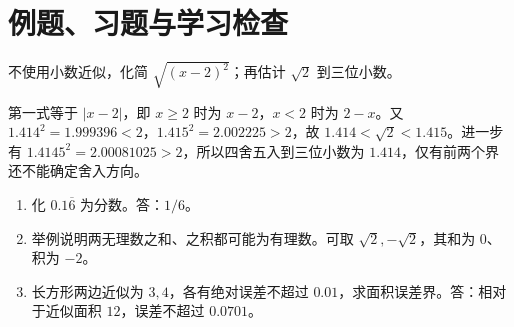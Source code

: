 \section{例题、习题与学习检查}
\begin{example}
不使用小数近似，化简 $\sqrt{(x-2)^2}$；再估计 $\sqrt2$ 到三位小数。
\end{example}
\begin{solve}
第一式等于 $|x-2|$，即 $x\ge2$ 时为 $x-2$，$x<2$ 时为 $2-x$。又 $1.414^2=1.999396<2$，$1.415^2=2.002225>2$，故 $1.414<\sqrt2<1.415$。进一步有 $1.4145^2=2.00081025>2$，所以四舍五入到三位小数为 $1.414$，仅有前两个界还不能确定舍入方向。
\end{solve}
\begin{enumerate}
\item 化 $0.1\overline6$ 为分数。答：$1/6$。
\item 举例说明两无理数之和、之积都可能为有理数。可取 $\sqrt2,-\sqrt2$，其和为 $0$、积为 $-2$。
\item 长方形两边近似为 $3,4$，各有绝对误差不超过 $0.01$，求面积误差界。答：相对于近似面积 $12$，误差不超过 $0.0701$。
\end{enumerate}

